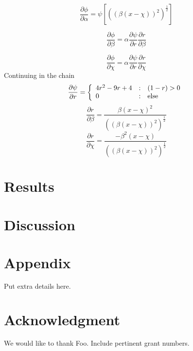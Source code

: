 \documentclass[]{paper}
\begin{document}
\[
\frac{\partial \phi}{\partial \alpha} = \psi \left [ ((\beta(x-\chi))^2)^\frac{1}{2}\right ]
\]

\[
\frac{\partial \phi}{\partial \beta} = \alpha \frac{\partial
  \psi}{\partial r} \frac{\partial r}{\partial \beta}
\]

\[
\frac{\partial \phi}{\partial \chi} = \alpha \frac{\partial
  \psi}{\partial r} \frac{\partial r}{\partial \chi}
\]
Continuing in the chain
\[
\frac{\partial \psi}{\partial r} = \left\{ 
\begin{array}{l@{\quad:\quad}l}
4r^2 - 9r + 4 & (1-r) > 0\\
0 & \mbox{else}
\end{array} \right.
\]
\[
\frac{\partial r}{\partial \beta} = 
\frac{\beta(x-\chi)^2}{((\beta(x-\chi))^2)^\frac{1}{2}}
\]
\[
\frac{\partial r}{\partial \chi} = 
\frac{-\beta^2(x-\chi)}{((\beta(x-\chi))^2)^\frac{1}{2}}
\]

\section{Results}

\section{Discussion}

\section*{Appendix}
Put extra details here.

\section*{Acknowledgment}
We would like to thank Foo. Include pertinent grant numbers.



\end{document}
